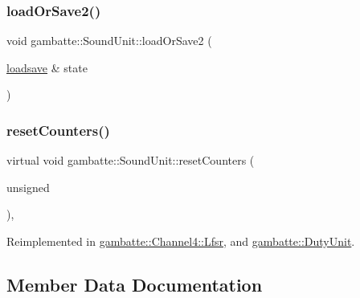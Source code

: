 \mbox{\label{classgambatte_1_1SoundUnit_a3f33fea3fbb7987029b74cbc64d7668f}} 
\subsubsection{\texorpdfstring{load\+Or\+Save2()}{loadOrSave2()}}
{\footnotesize\ttfamily void gambatte\+::\+Sound\+Unit\+::load\+Or\+Save2 (\begin{DoxyParamCaption}\item[{\hyperlink{classgambatte_1_1loadsave}{loadsave} \&}]{state }\end{DoxyParamCaption})\hspace{0.3cm}{\ttfamily [inline]}}

\mbox{\label{classgambatte_1_1SoundUnit_a3baa270f75463b24cd79fe5970103d4f}} 
\subsubsection{\texorpdfstring{reset\+Counters()}{resetCounters()}}
{\footnotesize\ttfamily virtual void gambatte\+::\+Sound\+Unit\+::reset\+Counters (\begin{DoxyParamCaption}\item[{unsigned}]{ }\end{DoxyParamCaption})\hspace{0.3cm}{\ttfamily [inline]}, {\ttfamily [virtual]}}



Reimplemented in \hyperlink{classgambatte_1_1Channel4_1_1Lfsr_acdeb93a45132b45567f97878ed6306b9}{gambatte\+::\+Channel4\+::\+Lfsr}, and \hyperlink{classgambatte_1_1DutyUnit_a69b982611026639129fda42e637e7b12}{gambatte\+::\+Duty\+Unit}.



\subsection{Member Data Documentation}
\mbox{\label{classgambatte_1_1SoundUnit_a06297f078dca7d403648ce3455a790be}} 
